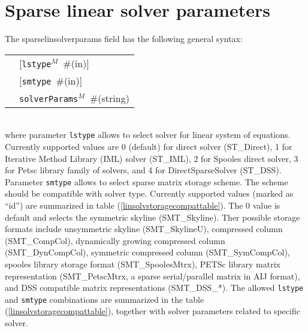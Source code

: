 \documentclass[a4paper]{report}
\newcommand{\param}[1]{\texttt{#1}} %
\newcommand{\optional}[1]{[#1]} %
\newcommand{\field}[2]{\param{#1}~\#{\tiny(#2)}} %
\newcommand{\optField}[2]{\optional{\field{#1}{#2}}}
\newenvironment{record}[1][]{\begin{tabular}{|ll}}{\end{tabular}\\}
\newcommand{\recentry}[2]{{#1}&{#2}\\}
\newcounter{rcc}
\newenvironment{record}[1][\textwidth]{\setcounter{rcc}{0}\rowcolors{1}{lightgray}{lightgray}\tabularx{#1}{llR} \hline}
               {\endtabularx}
\newcommand{\recentry}[2]{\ifthenelse{\value{rcc}>0}{$\backslash$ \\}{\setcounter{rcc}{1}}{#1}&{#2}&}
\begin{document}
\section{Sparse linear solver parameters}
\label{sparselinsolver}
The sparselinsolverparams field has the following general syntax:\\
\begin{record}
  \recentry{\hspace{20mm}}{\optField{lstype$^M$}{in}}
  \recentry{}{\optField{smtype}{in}}
  \recentry{}{\field{solverParams$^M$}{string}}
\end{record}
where parameter \param{lstype} allows to select solver for linear system of
equations. Currently supported values are 0 (default) for direct solver
(ST\_Direct), 1 for Iterative Method Library (IML) solver (ST\_IML),
2 for Spooles direct solver, 3 for Petsc
library family of solvers, and 4 for DirectSparseSolver (ST\_DSS).
Parameter \param{smtype} allows to select sparse matrix storage
scheme. The scheme should be compatible with solver type.
Currently supported values (marked as ``id'') are summarized in table
(\ref{linsolvstoragecompattable}). The 0 value is default and selects
the symmetric skyline (SMT\_Skyline). Ther possible storage formats
include unsymmetric skyline (SMT\_SkylineU),
compressed column (SMT\_CompCol), dynamically growing compressed
column (SMT\_DynCompCol), symmetric compressed column
(SMT\_SymCompCol), spooles library storage format (SMT\_SpoolesMtrx),
PETSc library matrix representation (SMT\_PetscMtrx, a sparse
serial/parallel matrix in AIJ format), and DSS compatible matrix
representations (SMT\_DSS\_*).
The allowed \param{lstype} and \param{smtype} combinations are
summarized in the table (\ref{linsolvstoragecompattable}), together
with solver parameters related to specific solver.
\end{document}

